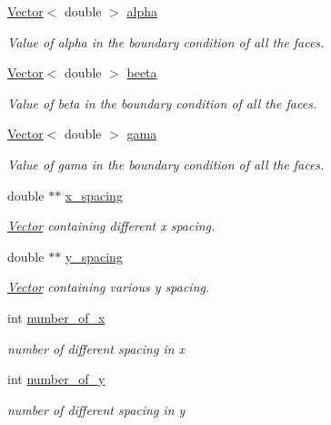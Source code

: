 \begin{DoxyCompactItemize}
\hyperlink{class_vector}{Vector}$<$ double $>$ \hyperlink{class_compute_matrix_a996dc180f923f06e05f8bbdacd377c5b}{alpha}
\begin{DoxyCompactList}\small\item\em Value of alpha in the boundary condition of all the faces. \end{DoxyCompactList}\item 
\hyperlink{class_vector}{Vector}$<$ double $>$ \hyperlink{class_compute_matrix_a870eba0db8cadb9bb5297250b33b8110}{beeta}
\begin{DoxyCompactList}\small\item\em Value of beta in the boundary condition of all the faces. \end{DoxyCompactList}\item 
\hyperlink{class_vector}{Vector}$<$ double $>$ \hyperlink{class_compute_matrix_a4ce47d86505bff39d030ee28dceb1ca4}{gama}
\begin{DoxyCompactList}\small\item\em Value of gama in the boundary condition of all the faces. \end{DoxyCompactList}\item 
double $\ast$$\ast$ \hyperlink{class_compute_matrix_a85b0f0b3ccd0fad1218d7ca78c34c7d9}{x\+\_\+spacing}
\begin{DoxyCompactList}\small\item\em \hyperlink{class_vector}{Vector} containing different x spacing. \end{DoxyCompactList}\item 
double $\ast$$\ast$ \hyperlink{class_compute_matrix_a1b6929ee0703c5394e8af381ff870012}{y\+\_\+spacing}
\begin{DoxyCompactList}\small\item\em \hyperlink{class_vector}{Vector} containing various y spacing. \end{DoxyCompactList}\item 
int \hyperlink{class_compute_matrix_ae56d59f2a47b7f6f55a1612172720852}{number\+\_\+of\+\_\+x}
\begin{DoxyCompactList}\small\item\em number of different spacing in x \end{DoxyCompactList}\item 
int \hyperlink{class_compute_matrix_a0efb5ccd0d7d26dd879b0095f982b639}{number\+\_\+of\+\_\+y}
\begin{DoxyCompactList}\small\item\em number of different spacing in y \end{DoxyCompactList}\end{DoxyCompactItemize}


